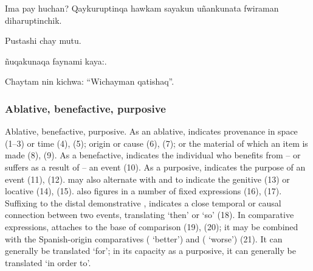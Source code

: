 {%
{\textquestiondown{}Ima pay huchan? Qaykuruptinqa hawkam sayakun u\~nankunata fwiraman diharuptinchik.}%
{}%
{}{}%

%
{Pustashi chay mutu.}%
{}%
{}{}%

%
{\~nuqakunaqa faynami kaya:.}%
{}%
{}{}%

%
{Chaytam nin kichwa: ``Wichayman qatishaq''.}%
{}%
{}{}%

\subsubsection{Ablative, benefactive, purposive }\label{ssec:ablbenpur}
Ablative, benefactive, purposive. As an ablative,  indicates provenance in space (1--3) or time (4), (5); origin or cause (6), (7); or the material of which an item is made (8), (9). As a benefactive,  indicates the individual who benefits from -- or suffers as a result of -- an event (10). As a purposive,  indicates the purpose of an event (11), (12).  may also alternate with  and  to indicate the genitive (13) or locative (14), (15).  also figures in a number of fixed expressions (16), (17). Suffixing to the distal demonstrative ,  indicates a close temporal or causal connection between two events, translating `then' or `so' (18). In comparative expressions,  attaches to the base of comparison (19), (20); it may be combined with the Spanish-origin comparatives  ( `better') and  ( `worse') (21). It can generally be translated `for'; in its capacity as a purposive, it can generally be translated `in order to'.

}
